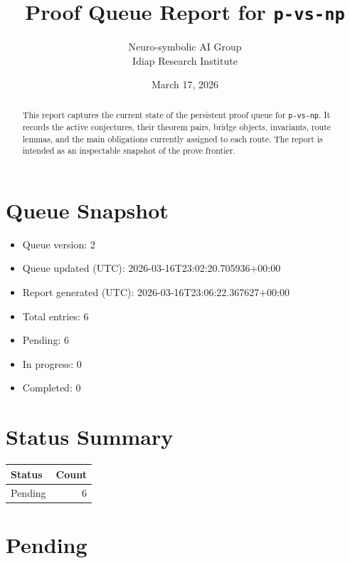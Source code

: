 \documentclass[11pt]{article}
\title{Proof Queue Report for \texttt{p-vs-np}}
\author{Neuro-symbolic AI Group\\Idiap Research Institute}
\date{March 17, 2026}
\begin{document}
\maketitle

\begin{abstract}
This report captures the current state of the persistent proof queue for \texttt{p-vs-np}.
It records the active conjectures, their theorem pairs, bridge objects, invariants, route lemmas, and the main obligations
currently assigned to each route. The report is intended as an inspectable snapshot of the prove frontier.
\end{abstract}

\section{Queue Snapshot}
\begin{itemize}[leftmargin=*,itemsep=0.25em]
\item Queue version: 2
\item Queue updated (UTC): 2026-03-16T23:02:20.705936+00:00
\item Report generated (UTC): 2026-03-16T23:06:22.367627+00:00
\item Total entries: 6
\item Pending: 6
\item In progress: 0
\item Completed: 0
\end{itemize}

\section{Status Summary}
\begin{center}
\begin{tabular}{lr}
\toprule
Status & Count \\
\midrule
Pending & 6 \\
\bottomrule
\end{tabular}
\end{center}

\section{Pending}
\end{document}
